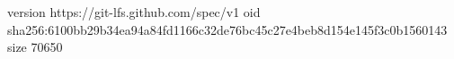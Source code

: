 version https://git-lfs.github.com/spec/v1
oid sha256:6100bb29b34ea94a84fd1166c32de76bc45c27e4beb8d154e145f3c0b1560143
size 70650
